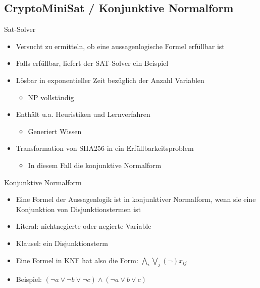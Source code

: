 \documentclass{beamer}
\begin{document}
  \subsection{CryptoMiniSat / Konjunktive Normalform}
    \begin{frame}{Sat-Solver}
      \begin{itemize}
        \setlength{\itemsep}{12pt}
        \item Versucht zu ermitteln, ob eine aussagenlogische Formel erfüllbar ist
        \item Falls erfüllbar, liefert der SAT-Solver ein Beispiel
        \item Lösbar in exponentieller Zeit bezüglich der Anzahl Variablen
        \begin{itemize}
          \item NP vollständig
        \end{itemize}
        \item Enthält u.a. Heuristiken und Lernverfahren
        \begin{itemize}
         \item Generiert Wissen
        \end{itemize}
        \item Transformation von SHA256 in ein Erfüllbarkeitsproblem
        \begin{itemize}
         \item In diesem Fall die konjunktive Normalform
        \end{itemize}
      \end{itemize}
    \end{frame}
    \begin{frame}{Konjunktive Normalform}
      \begin{itemize}
        \setlength{\itemsep}{16pt}
        \item Eine Formel der Aussagenlogik ist in konjunktiver Normalform, wenn sie eine Konjunktion von Disjunktionstermen ist
        \item Literal: nichtnegierte oder negierte Variable
        \item Klausel: ein Disjunktionsterm
        \item Eine Formel in KNF hat also die Form: \newline \newline $ \bigwedge\limits_{i} \bigvee\limits_{j} (\neg)x_{ij} $
        \item Beispiel: $ (\neg a \vee \neg b \vee \neg c) \wedge (\neg a \vee b \vee c) $
      \end{itemize}
    \end{frame}
\end{document}
